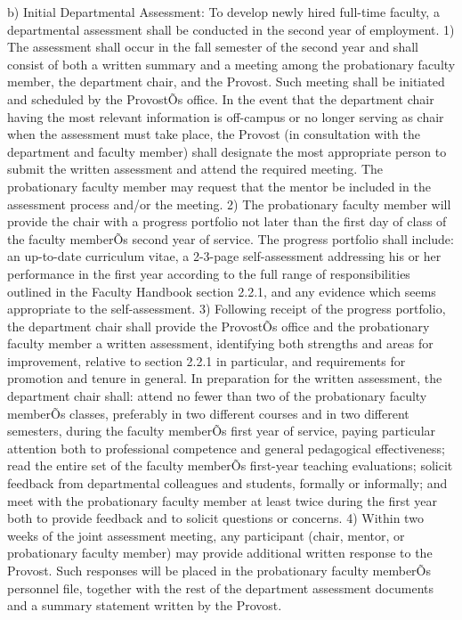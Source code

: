 \documentclass[letterpaper, 11pt]{article}
\begin{document}
	b) Initial Departmental Assessment:  To develop newly hired full-time faculty, a departmental assessment shall be conducted in the second year of employment.
	1) The assessment shall occur in the fall semester of the second year and shall consist of both a written summary and a meeting among the probationary faculty member, the department chair, and the Provost.  Such meeting shall be initiated and scheduled by the ProvostÕs office.  In the event that the department chair having the most relevant information is off-campus or no longer serving as chair when the assessment must take place, the Provost (in consultation with the department and faculty member) shall designate the most appropriate person to submit the written assessment and attend the required meeting.  The probationary faculty member may request that the mentor be included in the assessment process and/or the meeting.
	2) The probationary faculty member will provide the chair with a progress portfolio not later than the first day of class of the faculty memberÕs second year of service. The progress portfolio shall include:  an up-to-date curriculum vitae, a 2-3-page self-assessment addressing his or her performance in the first year according to the full range of responsibilities outlined in the Faculty Handbook section 2.2.1, and any evidence which seems appropriate to the self-assessment.
	3) Following receipt of the progress portfolio, the department chair shall provide the ProvostÕs office and the probationary faculty member a written assessment, identifying both strengths and areas for improvement, relative to section 2.2.1 in particular, and requirements for promotion and tenure in general.  In preparation for the written assessment, the department chair shall:  attend no fewer than two of the probationary faculty memberÕs classes, preferably in two different courses and in two different semesters, during the faculty memberÕs first year of service, paying particular attention both to professional competence and general pedagogical effectiveness; read the entire set of the faculty memberÕs first-year teaching evaluations; solicit feedback from departmental colleagues and students, formally or informally; and meet with the probationary faculty member at least twice during the first year both to provide feedback and to solicit questions or concerns.
	4) Within two weeks of the joint assessment meeting, any participant (chair, mentor, or probationary faculty member) may provide additional written response to the Provost.  Such responses will be placed in the probationary faculty memberÕs personnel file, together with the rest of the department assessment documents and a summary statement written by the Provost.
\end{document}
